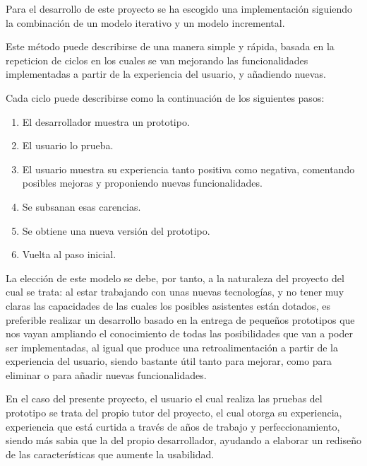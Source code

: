 Para el desarrollo de este proyecto se ha escogido una implementación siguiendo la combinación de un modelo iterativo y un modelo incremental.~\cite{mod-it-inc}

Este método puede describirse de una manera simple y rápida, basada en la repeticion de ciclos en los cuales se van mejorando las funcionalidades implementadas a partir de la experiencia del usuario, y añadiendo nuevas.

Cada ciclo puede describirse como la continuación de los siguientes pasos:

\begin{enumerate}
    \item El desarrollador muestra un prototipo.
    \item El usuario lo prueba.
    \item El usuario muestra su experiencia tanto positiva como negativa, comentando posibles mejoras y proponiendo nuevas funcionalidades.
    \item Se subsanan esas carencias.
    \item Se obtiene una nueva versión del prototipo.
    \item Vuelta al paso inicial.
\end{enumerate}{}

La elección de este modelo se debe, por tanto, a la naturaleza del proyecto del cual se trata: al estar trabajando con unas nuevas tecnologías, y no tener muy claras las capacidades de las cuales los posibles asistentes están dotados, es preferible realizar un desarrollo basado en la entrega de pequeños prototipos que nos vayan ampliando el conocimiento de todas las posibilidades que van a poder ser implementadas, al igual que produce una retroalimentación a partir de la experiencia del usuario, siendo bastante útil tanto para mejorar, como para eliminar o para añadir nuevas funcionalidades.

En el caso del presente proyecto, el usuario el cual realiza las pruebas del prototipo se trata del propio tutor del proyecto, el cual otorga su experiencia, experiencia que está curtida a través de años de trabajo y perfeccionamiento, siendo más sabia que la del propio desarrollador, ayudando a elaborar un rediseño de las características que aumente la usabilidad. 
